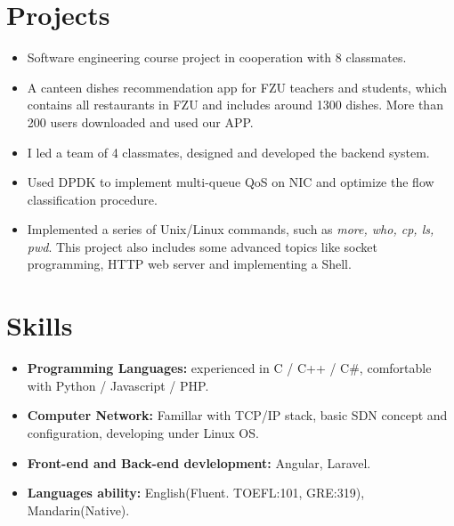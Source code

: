 \documentclass{resume}
\begin{document}
\section{Projects}
\begin{itemize}
  \item Software engineering course project in cooperation with 8 classmates.
  \item A canteen dishes recommendation app for FZU teachers and students, which contains all restaurants in FZU and includes around 1300 dishes. More than 200 users downloaded and used our APP.
  \item I led a team of 4 classmates, designed and developed the backend system.
\end{itemize}

\begin{itemize}
  \item Used DPDK to implement multi-queue QoS on NIC and optimize the flow classification procedure.
\end{itemize}

\begin{itemize}
  \item Implemented a series of Unix/Linux commands, such as \textit{more, who, cp, ls, pwd}. This project also includes some advanced topics like socket programming, HTTP web server and implementing a Shell.
\end{itemize}

\section{Skills}
\begin{itemize}[parsep=0.5ex]
  \item \textbf{Programming Languages:} experienced in C / C++ / C\#, comfortable with Python / Javascript / PHP.
  \item \textbf{Computer Network:} Famillar with TCP/IP stack, basic SDN concept and configuration, developing under Linux OS.
  \item \textbf{Front-end and Back-end devlelopment:} Angular, Laravel.
  \item \textbf{Languages ability:} English(Fluent. TOEFL:101, GRE:319), Mandarin(Native).
\end{itemize}
\end{document}
